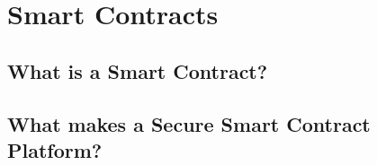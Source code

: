 \section{Smart Contracts}\label{sec::smartcontracts}

\subsection{What is a Smart Contract?}

\subsection{What makes a Secure Smart Contract Platform?}